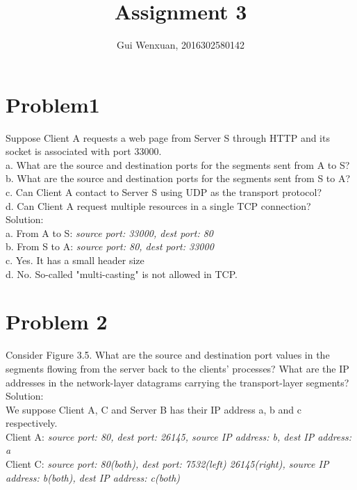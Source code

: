 \documentclass{article}
\author{Gui Wenxuan, 2016302580142}
\title{Assignment 3}
\begin{document}
   \maketitle
  
\newpage
\section{Problem1} Suppose Client A requests a web page from Server S through HTTP and its socket is associated with port 33000.\\
a. What are the source and destination ports for the segments sent from A to S?\\ 
b. What are the source and destination ports for the segments sent from S to A? \\
c. Can Client A contact to Server S using UDP as the transport protocol?\\
d. Can Client A request multiple resources in a single TCP connection?\\



\noindent Solution:\\
a. From A to S: \emph{source port: 33000, dest port: 80}\\
b. From S to A: \emph{source port: 80, dest port: 33000}\\
c. Yes. It has a small header size\\
d. No. So-called "multi-casting" is not allowed in TCP.


\newpage
\section{Problem 2} Consider Figure 3.5. What are the source and destination port values in the segments flowing from the server back to the clients’ processes? What are the IP addresses in the network-layer datagrams carrying the transport-layer segments?\\ 

\noindent Solution:\\
We suppose Client A, C and Server B has their IP address a, b and c respectively.\\
Client A: \emph{source port: 80, dest port: 26145, source IP address: b, dest IP address: a}\\
Client C: \emph{source port: 80(both), dest port: 7532(left) 26145(right), source IP address: b(both), dest IP address: c(both)}


\newpage
\end{document}
